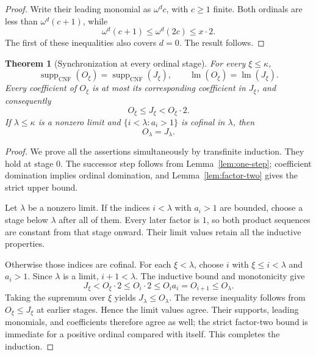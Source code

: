 \documentclass[11pt,letterpaper]{article}
\newtheorem{theorem}{Theorem}[section]
\theoremstyle{definition}
\theoremstyle{remark}
\newcommand{\CNF}{\operatorname{CNF}}
\newcommand{\supp}{\operatorname{supp}}
\newcommand{\lead}{\operatorname{lm}}
\begin{document}
\begin{proof}
Write their leading monomial as $\omega^d c$, with $c\geq1$ finite.
Both ordinals are less than $\omega^d(c+1)$, while
\[
 \omega^d(c+1)\leq\omega^d(2c)\leq x\cdot2.
\]
The first of these inequalities also covers $d=0$. The result follows.
\end{proof}

\begin{theorem}[Synchronization at every ordinal stage]\label{thm:sync}
For every $\xi\leq\kappa$,
\begin{equation}\label{eq:support-sync}
 \supp_{\CNF}(O_\xi)=\supp_{\CNF}(J_\xi),
 \qquad \lead(O_\xi)=\lead(J_\xi).
\end{equation}
Every coefficient of $O_\xi$ is at most its corresponding coefficient in
$J_\xi$, and consequently
\begin{equation}\label{eq:uniform-bound}
 \boxed{O_\xi\leq J_\xi<O_\xi\cdot2.}
\end{equation}
If $\lambda\leq\kappa$ is a nonzero limit and
$\{i<\lambda:a_i>1\}$ is cofinal in $\lambda$, then
\begin{equation}\label{eq:limit-equality}
 O_\lambda=J_\lambda.
\end{equation}
\end{theorem}

\begin{proof}
We prove all the assertions simultaneously by transfinite induction.
They hold at stage $0$. The successor step follows from
Lemma~\ref{lem:one-step}; coefficient domination implies ordinal domination,
and Lemma~\ref{lem:factor-two} gives the strict upper bound.

Let $\lambda$ be a nonzero limit. If the indices $i<\lambda$ with $a_i>1$
are bounded, choose a stage below $\lambda$ after all of them. Every later
factor is $1$, so both product sequences are constant from that stage
onward. Their limit values retain all the inductive properties.

Otherwise those indices are cofinal. For each $\xi<\lambda$, choose
$i$ with $\xi\leq i<\lambda$ and $a_i>1$. Since $\lambda$ is a limit,
$i+1<\lambda$. The inductive bound and monotonicity give
\begin{equation}\label{eq:catch-up}
 J_\xi<O_\xi\cdot2\leq O_i\cdot2
         \leq O_i a_i=O_{i+1}\leq O_\lambda.
\end{equation}
Taking the supremum over $\xi$ yields $J_\lambda\leq O_\lambda$.
The reverse inequality follows from $O_\xi\leq J_\xi$ at earlier stages.
Hence the limit values agree. Their supports, leading monomials, and
coefficients therefore agree as well; the strict factor-two bound is
immediate for a positive ordinal compared with itself. This completes
the induction.
\end{proof}
\end{document}
